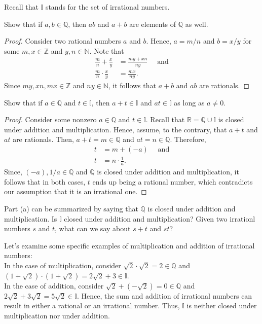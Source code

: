 \documentclass[12pt]{article}
\newcommand{\N}{\mathbb{N}}
\newcommand{\Z}{\mathbb{Z}}
\newcommand{\R}{\mathbb{R}}
\newcommand{\Q}{\mathbb{Q}}
\newenvironment{problem}[2][Problem]{\begin{trivlist}
		\item[\hskip \labelsep {\bfseries #1}\hskip \labelsep {\bfseries #2.}]}{\end{trivlist}}
\newenvironment{solution}[2][Solution]{\begin{trivlist}
		\item[\hskip \labelsep {\bfseries #1}\hskip \labelsep {\bfseries #2.}]}{\end{trivlist}}
\begin{document}
	\begin{problem}{1.4.1}
		Recall that $\mathbb{I}$ stands for the set of irrational numbers.
		\begin{enumerate}[label=(\alph*)]
			\item Show that if $a,b\in \Q$, then $ab$ and $a+b$ are elements of $\Q$ as well.
			\begin{proof}
				Consider two rational numbers $a$ and $b$. Hence, $a= m/n$ and $b=x/y$ for some $m,x\in \Z$ and $y,n\in \N$. Note that 
				\begin{align*}
					\frac{m}{n} + \frac{x}{y} &= \frac{my+xn}{ny}\quad \text{ and}\\
					\frac{m}{n}\cdot \frac{x}{y} &= \frac{mx}{ny}.
				\end{align*}
				Since $my,xn,mx \in \Z$ and $ny\in \N$, it follows that $a+b$ and $ab$ are rationals.
			\end{proof}
			\item Show that if $a\in \Q$ and $t\in \mathbb{I}$, then $a+t\in \mathbb{I}$ and $at\in \mathbb{I}$ as long as $a\neq 0$.
			\begin{proof}
				Consider some nonzero $a\in \Q$ and $t\in \mathbb{I}$. Recall that $\R = \Q\cup \mathbb{I}$ is closed under addition and multiplication. Hence, assume, to the contrary, that $a+t$ and $at$ are rationals. Then, $a+t = m\in \Q$ and $at = n\in \Q$. Therefore,
				\begin{align*}
					t &= m + (-a) \quad \text{ and}\\
					t &= n \cdot \frac{1}{a}.
				\end{align*} 
			Since, $(-a), 1/a \in \Q$ and $\Q$ is closed under addition and multiplication, it follows that in both cases, $t$ ends up being a rational number, which contradicts our assumption that it is an irrational one.  
			\end{proof}
			\item Part (a) can be summarized by saying that $\Q$ is closed under addition and multiplication. Is $\mathbb{I}$ closed under addition and multiplication? Given two irrationl numbers $s$ and $t$, what can we say about $s+t$ and $st$?
			\begin{solution}{c}
				Let's examine some specific examples of multiplication and addition of irrational numbers:\\
				In the case of multiplication, consider $\sqrt{2}\cdot \sqrt{2} = 2\in \Q$ and $(1+\sqrt{2})\cdot(1 +\sqrt{2}) = 2\sqrt{2} + 3\in \mathbb{I}$. \\
				In the case of addition,  consider $\sqrt{2} + (-\sqrt{2}) = 0 \in \Q$ and $2\sqrt{2} + 3\sqrt{2} = 5\sqrt{2} \in \mathbb{I}$. Hence, the sum and addition of irrational numbers can result in either a rational or an irrational number. Thus, $\mathbb{I}$ is neither closed under multiplication nor under addition.
			\end{solution}
		\end{enumerate}
	\end{problem}
 
\end{document}
